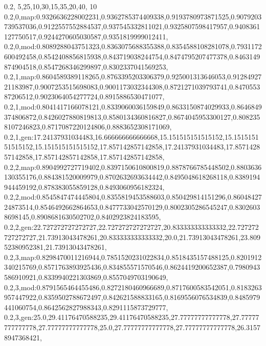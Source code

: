 0.2,
5,25,10,30,15,35,20,40,
10
0.2,0,map:0.9326636228002231,0.9362785374409338,0.9193780973871525,0.9079203739537036,0.9122557552884537,0.937545332811021,0.9325807598417957,0.9408361127750517,0.9244270605030587,0.9351819999012411,
0.2,0,mod:0.8089288043751323,0.8363075688355388,0.8354588108281078,0.7931172600492458,0.8542408856815938,0.843719038244754,0.8474795207477378,0.8463149874904518,0.8547268346299897,0.8302337041569253,
0.2,1,map:0.8604589389118265,0.8763395203306379,0.925001313646053,0.9128492721183987,0.9007253515698083,0.9001173032344308,0.8721271039793741,0.847055387206512,0.9023064054277724,0.8915886530471077,
0.2,1,mod:0.8041417166078121,0.8339060036159849,0.8633150874029933,0.8646849374806872,0.8426027880819813,0.8580134360816827,0.8674045953300127,0.8082358107246823,0.8717087220124806,0.8883652308171069,
0.2,1,gen:17.24137931034483,16.666666666666668,15.151515151515152,15.151515151515152,15.151515151515152,17.857142857142858,17.24137931034483,17.857142857142858,17.857142857142858,17.857142857142858,
0.2,2,map:0.8904992727719402,0.8397150610800819,0.8878766785448502,0.8803636130355176,0.884381520009979,0.8702632693634442,0.8495048618268118,0.8389194944459192,0.878383055859128,0.8493060956182324,
0.2,2,mod:0.8545847474445804,0.8355819453588603,0.850429814151296,0.8604842724873514,0.8546492662864653,0.8477733042570129,0.8002305286545247,0.83026038698145,0.8908681630502702,0.8402923824183595,
0.2,2,gen:22.727272727272727,22.727272727272727,20.833333333333332,22.727272727272727,21.73913043478261,20.833333333333332,20.0,21.73913043478261,23.80952380952381,21.73913043478261,
0.2,3,map:0.8298470011216944,0.7851520231022834,0.8518435157488125,0.8201912340215769,0.8571763893925436,0.834855571570546,0.8624419200652387,0.7980943586910921,0.8339940221303869,0.8557049703190649,
0.2,3,mod:0.8791565464455486,0.8272180460966689,0.8717600583542051,0.8183263957447922,0.8359502788672497,0.842621588833165,0.8169556076534839,0.8485979441060754,0.8642562827988343,0.8291115873729777,
0.2,3,gen:25.0,29.41176470588235,29.41176470588235,27.77777777777778,27.77777777777778,27.77777777777778,25.0,27.77777777777778,27.77777777777778,26.31578947368421,
